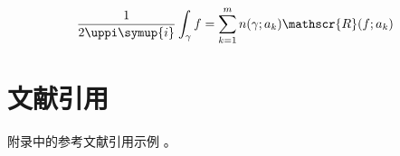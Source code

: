 \begin{equation}
  \frac{1}{2 \uppi \symup{i}} \int_\gamma f = \sum_{k=1}^m n(\gamma; a_k) \mathscr{R}(f; a_k)
  \label{eq:appendix-equation}
\end{equation}


\section{文献引用}

附录\cite{dupont1974bone}中的参考文献引用\cite{zhengkaiqing1987}示例
\cite{dupont1974bone,zhengkaiqing1987}。

\printbibliography


